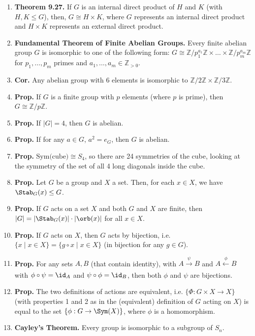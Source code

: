 \begin{enumerate}
	\item \textbf{Theorem 9.27. } If $G$ is an internal direct product of $H$ and $K$ (with $H,K \leq G$), then, $G \cong H \times K$, where $G$ represents an internal direct product and $H \times K$ represents an external direct product. 
	\item \textbf{Fundamental Theorem of Finite Abelian Groups. } Every finite abelian group $G$ is isomorphic to one of the following form: $G \cong \mathbb{Z}/p_1^{a_1}\mathbb{Z} \times \dots \times \mathbb{Z}/p_m^{a_m}\mathbb{Z}$ for $p_1,\dots,p_m$ primes and $a_1,\dots,a_m \in \mathbb{Z}_{>0}$. 
	\item \textbf{Cor. } Any abelian group with 6 elements is isomorphic to $\mathbb{Z}/2\mathbb{Z} \times \mathbb{Z}/3\mathbb{Z}$. 
	\item \textbf{Prop. } If $G$ is a finite group with $p$ elements (where $p$ is prime), then $G \cong \mathbb{Z}/p\mathbb{Z}$. 
	\item \textbf{Prop. } If $|G| = 4$, then $G$ is abelian. 
	\item \textbf{Prop. } If for any $a \in G$, $a^2 = e_G$, then $G$ is abelian. 
	\item \textbf{Prop. } $\textrm{Sym(cube)} \cong S_4$, so there are 24 symmetries of the cube, looking at the symmetry of the set of all 4 long diagonals inside the cube. 
	\item \textbf{Prop. } Let $G$ be a group and $X$ a set. Then, for each $x \in X$, we have $\Stab_G(x) \leq G$. 
	\item \textbf{Prop. } If $G$ acts on a set $X$ and both $G$ and $X$ are finite, then $|G|=|\Stab_G(x)| \cdot |\orb(x)|$ for all $x \in X$. 
	\item \textbf{Prop. } If $G$ acts on $X$, then $G$ acts by bijection, i.e. $\{x \mid x \in X\} = \{g \circ x \mid x \in X\}$ (in bijection for any $g \in G$). 
	\item \textbf{Prop. } For any sets $A,B$ (that contain identity), with $A \xrightarrow[]{\psi} B$ and $A \xleftarrow[]{\phi} B$ with $\phi \circ \psi = \id_A$ and $\psi \circ \phi = \id_B$, then both $\phi$ and $\psi$ are bijections. 
	\item \textbf{Prop. } The two definitions of actions are equivalent, i.e. $\{\Phi: G \times X \to X\}$ (with properties 1 and 2 as in the (equivalent) definition of $G$ acting on $X$) is equal to the set $\{\phi: G \to \Sym(X)\}$, where $\phi$ is a homomorphism. 
	\item \textbf{Cayley's Theorem. } Every group is isomorphic to a subgroup of $S_n$. 

\end{enumerate}

